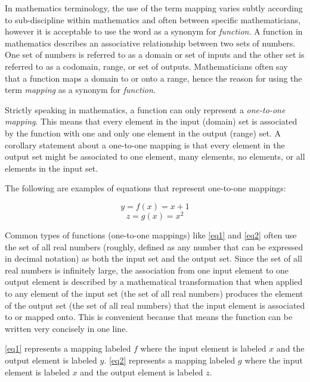 In mathematics terminology, the use of the term mapping varies subtly according to sub-discipline within mathematics and often between specific mathematicians, however it is acceptable to use the word as a synonym for \emph{function}. A function in mathematics describes an associative relationship between two sets of numbers. One set of numbers is referred to as a domain or set of inputs and the other set is referred to as a codomain, range, or set of outputs. Mathematicians often say that a function maps a domain to or onto a range, hence the reason for using the term \emph{mapping} as a synonym for \emph{function}.

Strictly speaking in mathematics, a function can only represent a \emph{one-to-one mapping}. This means that every element in the input (domain) set is associated by the function with one and only one element in the output (range) set. A corollary statement about a one-to-one mapping is that every element in the output set might be associated to one element, many elements, no elements, or all elements in the input set.

The following are examples of equations that represent one-to-one mappings:

\begin{equation} \label{eq1}
y = f(x) = x + 1
\end{equation}
\begin{equation} \label{eq2}
z = g(x) = x^{2}
\end{equation}

Common types of functions (one-to-one mappings) like \ref{eq1} and \ref{eq2} often use the set of all real numbers (roughly, defined as any number that can be expressed in decimal notation) as both the input set and the output set. Since the set of all real numbers is infinitely large, the association from one input element to one output element is described by a mathematical transformation that when applied to any element of the input set (the set of all real numbers) produces the element of the output set (the set of all real numbers) that the input element is associated to or mapped onto. This is convenient because that means the function can be written very concisely in one line. 

\ref{eq1} represents a mapping labeled \begin{math}f\end{math} where the input element is labeled \begin{math}x\end{math} and the output element is labeled \begin{math}y\end{math}. \ref{eq2} represents a mapping labeled \begin{math}g\end{math} where the input element is labeled \begin{math}x\end{math} and the output element is labeled \begin{math}z\end{math}. 

